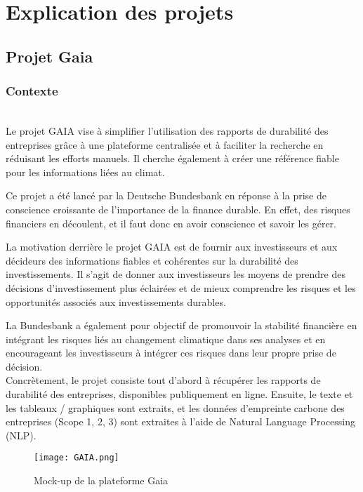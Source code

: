 \section{Explication des projets}


\subsection{Projet Gaia}

\subsubsection{Contexte}
~\\
Le projet GAIA vise à simplifier l'utilisation des rapports de durabilité des entreprises grâce à une plateforme centralisée et à faciliter la recherche en réduisant les efforts manuels. 
Il cherche également à créer une référence fiable pour les informations liées au climat.

Ce projet a été lancé par la Deutsche Bundesbank en réponse à la prise de conscience croissante de l'importance de la finance durable.
En effet, des risques financiers en découlent, et il faut donc en avoir conscience et savoir les gérer.

La motivation derrière le projet GAIA est de fournir aux investisseurs et aux décideurs des informations fiables et cohérentes sur la durabilité des investissements. 
Il s'agit de donner aux investisseurs les moyens de prendre des décisions d'investissement plus éclairées et de mieux comprendre les risques et les opportunités associés aux investissements durables.

La Bundesbank a également pour objectif de promouvoir la stabilité financière en intégrant les risques liés au changement climatique dans ses analyses et en encourageant les investisseurs à intégrer ces risques dans leur propre prise de décision.
\\

Concrètement, le projet consiste tout d'abord à récupérer les rapports de durabilité des entreprises, disponibles publiquement en ligne.
Ensuite, le texte et les tableaux / graphiques sont extraits, et les données d'empreinte carbone des entreprises (Scope 1, 2, 3) sont extraites à l'aide de Natural Language Processing (NLP).

\begin{figure}[H]
    \centering
    \texttt{[image: GAIA.png]}
    \caption{Mock-up de la plateforme Gaia}
\end{figure}

